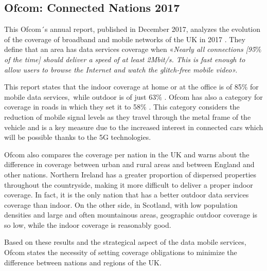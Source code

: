 \subsection*{Ofcom: Connected Nations 2017}
This Ofcom´s annual report, published in December 2017, analyzes the evolution of the coverage of broadband and mobile networks of the UK in 2017 \cite{1-32}. They define that an area has data services coverage when «\textit{Nearly all connections [95$\%$  of the time] should deliver a speed of at least 2Mbit/s. This is fast enough to allow users to browse the Internet and watch the glitch-free mobile video».}\par

This report states that the indoor coverage at home or at the office is of 85$\%$  for mobile data services,\ while outdoor is of just 63$\%$ .  Ofcom has also a category for coverage in roads in which they set it to 58$\%$ . This category considers the reduction of mobile signal levels as they travel through the metal frame of the vehicle and is a key measure due to the increased interest in connected cars which will be possible thanks to the 5G technologies.\par

Ofcom also compares the coverage per nation in the UK and warns about the difference in coverage between urban and rural areas and between England and other nations. Northern Ireland has a greater proportion of dispersed properties throughout the countryside, making it more difficult to deliver a proper indoor coverage. In fact, it is the only nation that has a better outdoor data services coverage than indoor. On the other side, in Scotland, with low population densities and large and often mountainous areas, geographic outdoor coverage is so low, while the indoor coverage is reasonably good. \par

Based on these results and the strategical aspect of the data mobile services, Ofcom states the necessity of setting coverage obligations to minimize the difference between nations and regions of the UK.




